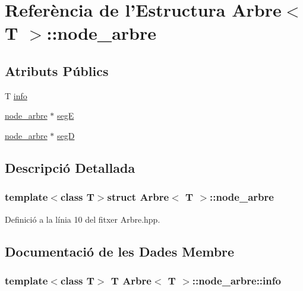 \hypertarget{struct_arbre_1_1node__arbre}{\section{Referència de l'Estructura Arbre$<$ T $>$\-:\-:node\-\_\-arbre}
\label{struct_arbre_1_1node__arbre}
}
\subsection*{Atributs Públics}
\begin{DoxyCompactItemize}
\item 
T \hyperlink{struct_arbre_1_1node__arbre_a5a146e5e27a7a6c5f54bc6df864595aa}{info}
\item 
\hyperlink{struct_arbre_1_1node__arbre}{node\-\_\-arbre} $\ast$ \hyperlink{struct_arbre_1_1node__arbre_add2e7f2ee789db9f38a3bf2d2dd36972}{seg\-E}
\item 
\hyperlink{struct_arbre_1_1node__arbre}{node\-\_\-arbre} $\ast$ \hyperlink{struct_arbre_1_1node__arbre_a9986e206810ba9e519b5b6e590238093}{seg\-D}
\end{DoxyCompactItemize}


\subsection{Descripció Detallada}
\subsubsection*{template$<$class T$>$struct Arbre$<$ T $>$\-::node\-\_\-arbre}



Definició a la línia 10 del fitxer Arbre.\-hpp.



\subsection{Documentació de les Dades Membre}
\hypertarget{struct_arbre_1_1node__arbre_a5a146e5e27a7a6c5f54bc6df864595aa}{
\subsubsection[{info}]{\setlength{\rightskip}{0pt plus 5cm}template$<$class T$>$ T {\bf Arbre}$<$ T $>$\-::node\-\_\-arbre\-::info}}\label{struct_arbre_1_1node__arbre_a5a146e5e27a7a6c5f54bc6df864595aa}


